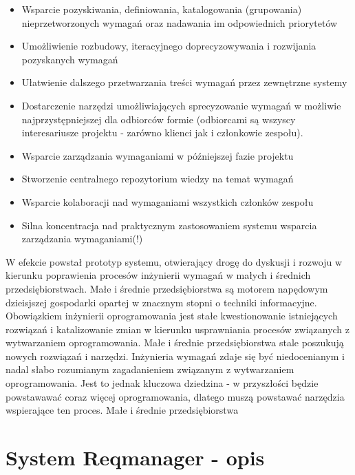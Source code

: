     \begin{itemize}
      \item Wsparcie pozyskiwania, definiowania, katalogowania (grupowania) nieprzetworzonych wymagań oraz nadawania im odpowiednich priorytetów
      \item Umożliwienie rozbudowy, iteracyjnego doprecyzowywania i rozwijania pozyskanych wymagań
      \item Ułatwienie dalszego przetwarzania treści wymagań przez zewnętrzne systemy
      \item Dostarczenie narzędzi umożliwiających sprecyzowanie wymagań w możliwie najprzystępniejszej dla odbiorców formie (odbiorcami są wszyscy interesariusze projektu - zarówno klienci jak i członkowie zespołu).
      \item Wsparcie zarządzania wymaganiami w późniejszej fazie projektu
      \item Stworzenie centralnego repozytorium wiedzy na temat wymagań
      \item Wsparcie kolaboracji nad wymaganiami wszystkich członków zespołu
      \item Silna koncentracja nad praktycznym zastosowaniem systemu wsparcia zarządzania wymaganiami(!) 
    \end{itemize}

    W efekcie powstał prototyp systemu, otwierający drogę do dyskusji i rozwoju w kierunku poprawienia procesów inżynierii wymagań w małych i średnich przedsiębiorstwach. Małe i średnie przedsiębiorstwa są motorem napędowym dzieisjszej gospodarki opartej w znacznym stopni o techniki informacyjne. Obowiązkiem inżynierii oprogramowania jest stałe kwestionowanie istniejących rozwiązań i katalizowanie zmian w kierunku usprawniania procesów związanych z wytwarzaniem oprogramowania. Małe i średnie przedsiębiorstwa stale poszukują nowych rozwiązań i narzędzi. Inżynieria wymagań zdaje się być niedocenianym i nadal słabo rozumianym zagadanieniem związanym z wytwarzaniem oprogramowania. Jest to jednak kluczowa dziedzina - w przyszłości będzie powstawawać coraz więcej oprogramowania, dlatego muszą powstawać narzędzia wspierające ten proces. Małe i średnie przedsiębiorstwa 

  \section{System Reqmanager - opis}

    

